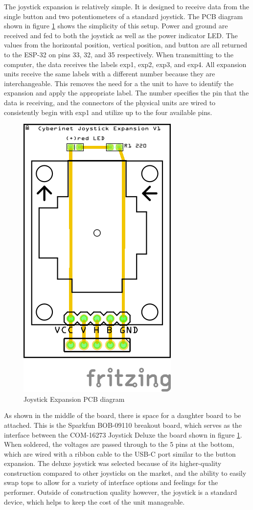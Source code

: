 The joystick expansion is relatively simple. It is designed to receive data from the single button and two potentiometers of a standard joystick. The PCB diagram shown in figure \ref{fig:jsPCB} shows the simplicity of this setup. Power and ground are received and fed to both the joystick as well as the power indicator LED. The values from the horizontal position, vertical position, and button are all returned to the ESP-32 on pins 33, 32, and 35 respectively. When transmitting to the computer, the data receives the labels exp1, exp2, exp3, and exp4. All expansion units receive the same labels with a different number because they are interchangeable. This removes the need for a the unit to have to identify the expansion and apply the appropriate label. The number specifies the pin that the data is receiving, and the connectors of the physical units are wired to consistently begin with exp1 and utilize up to the four available pins.

\begin{figure}
    \centering
    \includegraphics{diagrams/PCBs/thumbPCBv1.png}
    \caption{Joystick Expansion PCB diagram}
    \label{fig:jsPCB}
\end{figure}

As shown in the middle of the board, there is space for a daughter board to be attached. This is the Sparkfun BOB-09110 breakout board, which serves as the interface between the COM-16273 Joystick Deluxe the board shown in figure \ref{fig:jsPCB}. When soldered, the voltages are passed through to the 5 pins at the bottom, which are wired with a ribbon cable to the USB-C port similar to the button expansion. The deluxe joystick was selected because of its higher-quality construction compared to other joysticks on the market, and the ability to easily swap tops to allow for a variety of interface options and feelings for the performer. Outside of construction quality however, the joystick is a standard device, which helps to keep the cost of the unit manageable.

